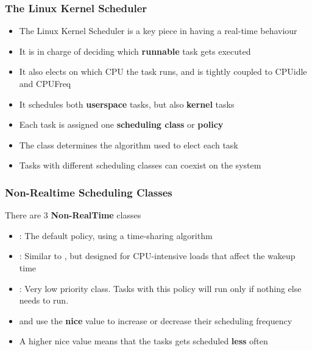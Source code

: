 \begin{frame}
	\frametitle{The Linux Kernel Scheduler}
	\begin{itemize}
		\item The Linux Kernel Scheduler is a key piece in having a real-time behaviour
		\item It is in charge of deciding which \textbf{runnable} task gets executed
		\item It also elects on which CPU the task runs, and is tightly coupled to CPUidle and CPUFreq
		\item It schedules both \textbf{userspace} tasks, but also \textbf{kernel} tasks
		\item Each task is assigned one \textbf{scheduling class} or \textbf{policy}
		\item The class determines the algorithm used to elect each task
		\item Tasks with different scheduling classes can coexist on the system
	\end{itemize}
\end{frame}

\begin{frame}
	\frametitle{Non-Realtime Scheduling Classes}
	There are 3 \textbf{Non-RealTime} classes
	\begin{itemize}
		\item {} : The default policy, using a time-sharing algorithm
		\item {} : Similar to , but designed for CPU-intensive loads that affect the wakeup time
		\item {} : Very low priority class. Tasks with this policy will run only if nothing else needs to run.
		\item {} and  use the \textbf{nice} value to increase or decrease their scheduling frequency
		\item A higher nice value means that the tasks gets scheduled \textbf{less} often
	\end{itemize}
\end{frame}

